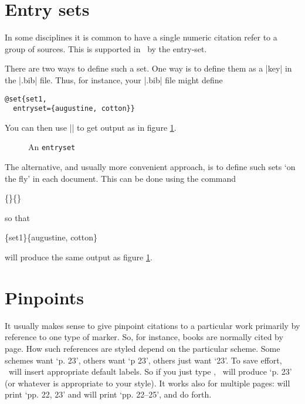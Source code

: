 \section{Entry sets}

In some disciplines it is common to have a single numeric citation
refer to a group of sources. This is supported in \biblatex\ by the
entry-set.

There are two ways to define such a set. One way is to define them as
a |key| in the |.bib| file. Thus, for instance, your |.bib| file might
define
\begin{Verbatim}
@set{set1,
  entryset={augustine, cotton}}
\end{Verbatim}
You can then use |\cite{set1}| to get output as in figure \ref{entryset1}.
\begin{figure}
\caption{An \texttt{entryset}\label{entryset1}}
\end{figure}

The alternative, and usually more convenient approach, is to define
such sets `on the fly' in each document. This can be done using the
command
\begin{pseudoverb}
  \centering{}\{\}\{\}
\end{pseudoverb}
so that
\begin{pseudoverb}
  \centering
{}\{set1\}\{augustine, cotton\}
\end{pseudoverb}
will produce the same output as figure \ref{entryset1}.

\section{Pinpoints}

It usually makes sense to give pinpoint citations to a particular work
primarily by reference to one type of marker. So, for instance, books
are normally cited by page. How such references are styled depend on
the particular scheme. Some schemes want `p. 23', others want `p 23',
others just want `23'. To save effort, \biblatex\ will insert
appropriate default labels. So if you just type ,
\biblatex\ will produce `p. 23' (or whatever is appropriate to your
style). It works also for multiple pages: 
will print `pp. 22, 23' and  will print
`pp. 22--25', and do forth.


